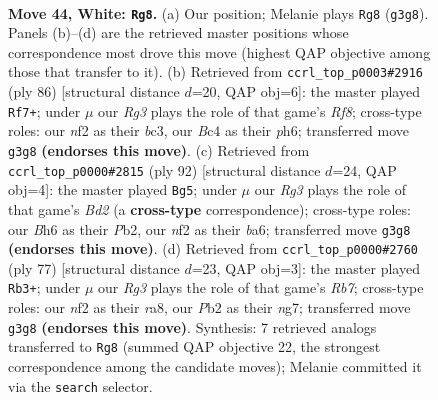 \documentclass[11pt]{article}
\begin{document}
\clearpage

\begin{figure}[p]\centering
\begin{subfigure}{0.46\textwidth}\centering
\resizebox{\linewidth}{!}{%
\newchessgame
\chessboard[
  setfen={8/pb1pr3/7B/5k2/2B5/6R1/PPK2n2/8 w - - 8 44},
  showmover=false,
  pgfstyle=straightmove, color=movearrow, markmove={g3-g8}
]}
\caption{}
\end{subfigure}\hfill
\begin{subfigure}{0.46\textwidth}\centering
\resizebox{\linewidth}{!}{%
\newchessgame
\chessboard[
  setfen={5R2/3k4/pr5p/8/4KP2/2b4P/B7/8 w - - 6 44},
  showmover=false,
  pgfstyle=straightmove, color=movearrow, markmove={f8-f7}
]}
\caption{}
\end{subfigure}
\\[4pt]
\begin{subfigure}{0.46\textwidth}\centering
\resizebox{\linewidth}{!}{%
\newchessgame
\chessboard[
  setfen={8/5k2/b2b4/3Pp2p/4B2P/8/1P1B1K2/8 w - - 3 47},
  showmover=false,
  pgfstyle=straightmove, color=movearrow, markmove={d2-g5}
]}
\caption{}
\end{subfigure}\hfill
\begin{subfigure}{0.46\textwidth}\centering
\resizebox{\linewidth}{!}{%
\newchessgame
\chessboard[
  setfen={R7/1p2k1N1/5p2/p1b5/2P3P1/5K1P/1r6/8 b - - 5 39},
  showmover=false,
  pgfstyle=straightmove, color=movearrow, markmove={b2-b3}
]}
\caption{}
\end{subfigure}
\caption{\textbf{Move 44, White: \texttt{Rg8}.} (a) Our position; Melanie plays \texttt{Rg8} (\texttt{g3g8}). Panels (b)--(d) are the retrieved master positions whose correspondence most drove this move (highest QAP objective among those that transfer to it). (b) Retrieved from \texttt{ccrl\_top\_p0003\#2916} (ply 86) [structural distance $d$=20, QAP obj=6]: the master played \texttt{Rf7+}; under $\mu$ our \emph{Rg3} plays the role of that game's \emph{Rf8}; cross-type roles: our \emph{n}f2 as their \emph{b}c3, our \emph{B}c4 as their \emph{p}h6; transferred move \texttt{g3g8} \textbf{(endorses this move)}. (c) Retrieved from \texttt{ccrl\_top\_p0000\#2815} (ply 92) [structural distance $d$=24, QAP obj=4]: the master played \texttt{Bg5}; under $\mu$ our \emph{Rg3} plays the role of that game's \emph{Bd2} (a \textbf{cross-type} correspondence); cross-type roles: our \emph{B}h6 as their \emph{P}b2, our \emph{n}f2 as their \emph{b}a6; transferred move \texttt{g3g8} \textbf{(endorses this move)}. (d) Retrieved from \texttt{ccrl\_top\_p0000\#2760} (ply 77) [structural distance $d$=23, QAP obj=3]: the master played \texttt{Rb3+}; under $\mu$ our \emph{Rg3} plays the role of that game's \emph{Rb7}; cross-type roles: our \emph{n}f2 as their \emph{r}a8, our \emph{P}b2 as their \emph{n}g7; transferred move \texttt{g3g8} \textbf{(endorses this move)}. Synthesis: 7 retrieved analogs transferred to \texttt{Rg8} (summed QAP objective 22, the strongest correspondence among the candidate moves); Melanie committed it via the \texttt{search} selector.}
\label{fig:thought-m86}
\end{figure}
\end{document}
